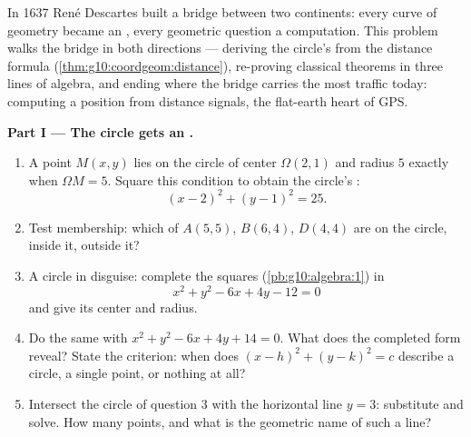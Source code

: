 \begin{problem}
\label{pb:g10:coordgeom:1}
In 1637 Ren\'e Descartes built a bridge between two continents:
every curve of geometry became an \emph{}, every
geometric question a computation. This problem walks the bridge
in both directions --- deriving the circle's  from the
distance formula (\cref{thm:g10:coordgeom:distance}), re-proving
classical theorems in three lines of algebra, and ending where
the bridge carries the most traffic today: computing a position
from distance signals, the flat-earth heart of GPS.

\medskip
\noindent\textbf{Part I --- The circle gets an .}
\begin{enumerate}
  \item A point $M(x, y)$ lies on the circle of center
        $\Omega(2, 1)$ and radius $5$ exactly when
        $\Omega M = 5$. Square this condition to obtain the
        circle's :
        \[
        (x - 2)^2 + (y - 1)^2 = 25 .
        \]
  \item Test membership: which of $A(5, 5)$, $B(6, 4)$,
        $D(4, 4)$ are on the circle, inside it, outside it?
  \item A circle in disguise: complete the squares
        (\cref{pb:g10:algebra:1}) in
        \[
        x^2 + y^2 - 6x + 4y - 12 = 0
        \]
        and give its center and radius.
  \item Do the same with $x^2 + y^2 - 6x + 4y + 14 = 0$. What
        does the completed form reveal? State the criterion: when
        does $(x - h)^2 + (y - k)^2 = c$ describe a circle, a
        single point, or nothing at all?
  \item Intersect the circle of question 3 with the horizontal
        line $y = 3$: substitute and solve. How many points, and
        what is the geometric name of such a line?
\end{enumerate}


\end{problem}
